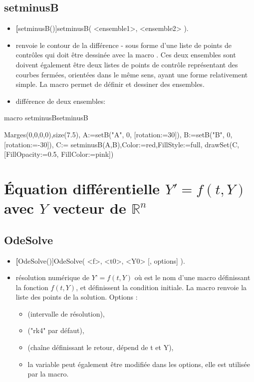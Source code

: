 \subsection{setminusB}\label{macsetminusB}
\begin{itemize}
 \item \util \textbf[setminusB()]{setminusB( <ensemble1>, <ensemble2> )}.
 \item \desc renvoie le contour de la différence  -  sous forme d'une liste de points de contrôles qui doit être dessinée avec la macro . Ces deux ensembles sont doivent également être deux listes de points de contrôle représentant des courbes fermées, orientées dans le même sens, ayant une forme relativement simple. La macro  permet de définir et dessiner des ensembles.
 \item \exem différence de deux ensembles:
\end{itemize}

\begin{demo}{macro setminusB}{setminusB}
\begin{texgraph}[name=setminusB]
Marges(0,0,0,0),size(7.5),
A:=setB("A", 0, [rotation:=30]), 
B:=setB("B", 0, [rotation:=-30]),
C:= setminusB(A,B),Color:=red,FillStyle:=full, 
drawSet(C, [FillOpacity:=0.5, FillColor:=pink])
\end{texgraph}
\end{demo}

\section{Équation différentielle $Y'=f(t,Y)$ avec $Y$ vecteur de $\mathbb R^n$}

\subsection{OdeSolve}\label{macOdeSolve} 
\begin{itemize}
 \item \util \textbf[OdeSolve()]{OdeSolve( <f>, <t0>, <Y0> [, options] )}.
 \item \desc résolution numérique de $Y’=f(t,Y)$ où  est le nom d’une macro définissant la fonction $f(t,Y)$,  et  définissent la condition initiale. La macro renvoie la liste des points de la solution. Options :
\begin{itemize}
 \item {} (intervalle de résolution),\par
 \item {} ("rk4" par défaut),\par
 \item {} (chaîne définissant le retour, dépend de t et Y),\par
 \item la variable  peut également être modifiée dans les options, elle est utilisée par la macro.
\end{itemize}
\end{itemize}


